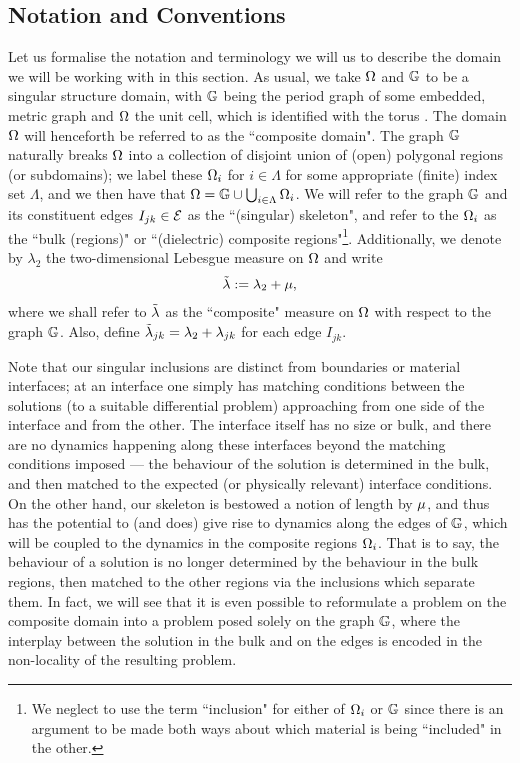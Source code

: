 \subsection{Notation and Conventions} \label{ssec:SINotation}
Let us formalise the notation and terminology we will us to describe the domain we will be working with in this section.
As usual, we take $\Omega$ and $\mathbb{G}$ to be a singular structure domain, with $\mathbb{G}$ being the period graph of some embedded, metric graph and $\Omega$ the unit cell, which is identified with the torus .
The domain $\Omega$ will henceforth be referred to as the ``composite domain".
The graph $\mathbb{G}$ naturally breaks $\Omega$ into a collection of disjoint union of (open) polygonal regions (or subdomains); we label these $\Omega_i$ for $i\in\Lambda$ for some appropriate (finite) index set $\Lambda$, and we then have that $\Omega = \mathbb{G}\cup\bigcup_{i\in\Lambda}\Omega_i$.
We will refer to the graph $\mathbb{G}$ and its constituent edges $I_{jk}\in\mathcal{E}$ as the ``(singular) skeleton", and refer to the $\Omega_i$ as the ``bulk (regions)" or ``(dielectric) composite regions"\footnote{We neglect to use the term ``inclusion" for either of $\Omega_i$ or $\mathbb{G}$ since there is an argument to be made both ways about which material is being ``included" in the other.}.
Additionally, we denote by $\lambda_2$ the two-dimensional Lebesgue measure on $\Omega$ and write
\begin{align*}
	\tilde{\lambda} := \lambda_2 + \mu,
\end{align*}
where we shall refer to $\tilde{\lambda}$ as the ``composite" measure on $\Omega$ with respect to the graph $\mathbb{G}$.
Also, define $\tilde{\lambda}_{jk} = \lambda_2 + \lambda_{jk}$ for each edge $I_{jk}$.

Note that our singular inclusions are distinct from boundaries or material interfaces; at an interface one simply has matching conditions between the solutions (to a suitable differential problem) approaching from one side of the interface and from the other.
The interface itself has no size or bulk, and there are no dynamics happening along these interfaces beyond the matching conditions imposed --- the behaviour of the solution is determined in the bulk, and then matched to the expected (or physically relevant) interface conditions.
On the other hand, our skeleton is bestowed a notion of length by $\mu$, and thus has the potential to (and does) give rise to dynamics along the edges of $\mathbb{G}$, which will be coupled to the dynamics in the composite regions $\Omega_i$.
That is to say, the behaviour of a solution is no longer determined by the behaviour in the bulk regions, then matched to the other regions via the inclusions which separate them.
In fact, we will see that it is even possible to reformulate a problem on the composite domain into a problem posed solely on the graph $\mathbb{G}$, where the interplay between the solution in the bulk and on the edges is encoded in the non-locality of the resulting problem.

